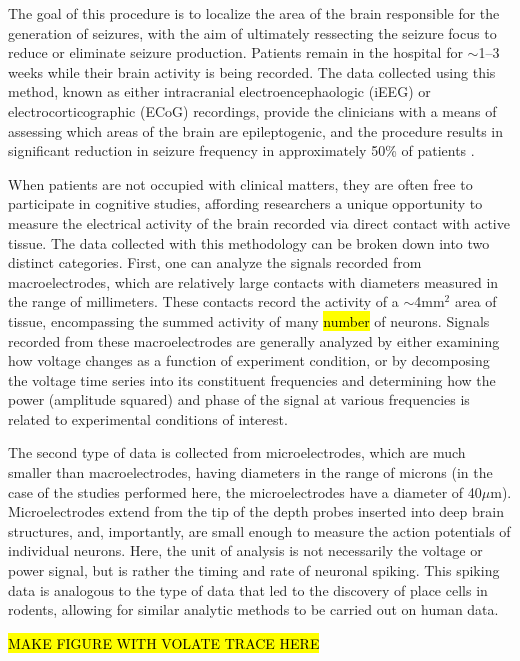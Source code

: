 The goal of this procedure is to localize the area of the brain responsible for the generation of seizures, with the aim of ultimately ressecting the seizure focus to reduce or eliminate seizure production. Patients remain in the hospital for $\sim$1--3 weeks while their brain activity is being recorded. The data collected using this method, known as either intracranial electroencephaologic (iEEG) or electrocorticographic (ECoG) recordings, provide the clinicians with a means of assessing which areas of the brain are epileptogenic, and the procedure results in significant reduction in seizure frequency in approximately 50\% of patients \citep{Kaha06}. 

When patients are not occupied with clinical matters, they are often free to participate in cognitive studies, affording researchers a unique opportunity to measure the electrical activity of the brain recorded via direct contact with active tissue. The data collected with this methodology can be broken down into two distinct categories. First, one can analyze the signals recorded from macroelectrodes, which are relatively large contacts with diameters measured in the range of millimeters. These contacts record the activity of a $\sim$4mm$^{2}$ area of tissue, encompassing the summed activity of many \hl{number} of neurons. Signals recorded from these macroelectrodes are generally analyzed by either examining how voltage changes as a function of experiment condition, or by decomposing the voltage time series into its constituent frequencies and determining how the power (amplitude squared) and phase of the signal at various frequencies is related to experimental conditions of interest.

The second type of data is collected from microelectrodes, which are much smaller than macroelectrodes, having diameters in the range of microns (in the case of the studies performed here, the microelectrodes have a diameter of 40$\mu$m). Microelectrodes extend from the tip of the depth probes inserted into deep brain structures, and, importantly, are small enough to measure the action potentials of individual neurons. Here, the unit of analysis is not necessarily the voltage or power signal, but is rather the timing and rate of neuronal spiking. This spiking data is analogous to the type of data that led to the discovery of place cells in rodents, allowing for similar analytic methods to be carried out on human data. 

\hl{MAKE FIGURE WITH VOLATE TRACE HERE}


